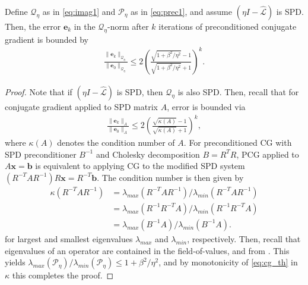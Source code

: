 \documentclass[review]{siamart}
\begin{document}
%
\begin{corollary}\label{cor:cg}
Define $\mathcal{Q}_\eta$ as in \eqref{eq:imag1} and $\mathcal{P}_\eta$ as in \eqref{eq:prec1},
and assume $(\eta I - \widehat{\mathcal{L}})$ is SPD. Then, the error $\mathbf{e}_k$ in the
$\mathcal{Q}_\eta$-norm after $k$ iterations of preconditioned conjugate gradient is bounded by
\begin{align*}
\frac{\|\mathbf{e}_k\|_{\mathcal{Q}_\eta}}{\|\mathbf{e}_0\|_{\mathcal{Q}_\eta}}
	\leq 2\left(\frac{\sqrt{1+\beta^2/\eta^2}-1}{\sqrt{1+\beta^2/\eta^2}+1}\right)^{k}.
\end{align*}
\end{corollary}
\begin{proof}
Note that if $(\eta I - \widehat{\mathcal{L}})$ is SPD, then $\mathcal{Q}_\eta$ is also
SPD. Then, recall that for conjugate gradient applied to SPD matrix $A$, error is
bounded via
\begin{align}\label{eq:cg_th}
\frac{\|\mathbf{e}_k\|_{A}}{\|\mathbf{e}_0\|_{A}}
	\leq 2\left(\frac{\sqrt{\kappa(A)}-1}{\sqrt{\kappa(A)}+1}\right)^{k},
\end{align}
where $\kappa(A)$ denotes the condition number of $A$. For preconditioned CG with 
SPD preconditioner $B^{-1}$ and Cholesky decomposition $B = R^TR$, PCG applied to
$A\mathbf{x}=\mathbf{b}$ is equivalent to applying CG to the modified SPD system
$(R^{-T}AR^{-1})R\mathbf{x} = R^{-T}\mathbf{b}$. The condition number is then given by
%
\begin{align*}
\kappa(R^{-T}AR^{-1}) & = \lambda_{max}(R^{-T}AR^{-1})/\lambda_{min}(R^{-T}AR^{-1}) \\
&= \lambda_{max}(R^{-1}R^{-T}A)/\lambda_{min}(R^{-1}R^{-T}A) \\
&= \lambda_{max}(B^{-1}A)/\lambda_{min}(B^{-1}A).
\end{align*}
%
for largest and smallest eigenvalues $\lambda_{max}$ and $\lambda_{min}$, respectively.
Then, recall that eigenvalues of an operator are contained in the field-of-values, and
from . This yields $\lambda_{max}(\mathcal{P}_\eta)/\lambda_{min}(\mathcal{P}_\eta)
\leq 1+\beta^2/\eta^2$, and by monotonicity of \eqref{eq:cg_th} in $\kappa$ this completes
the proof. 
\end{proof}
%
\end{document}
